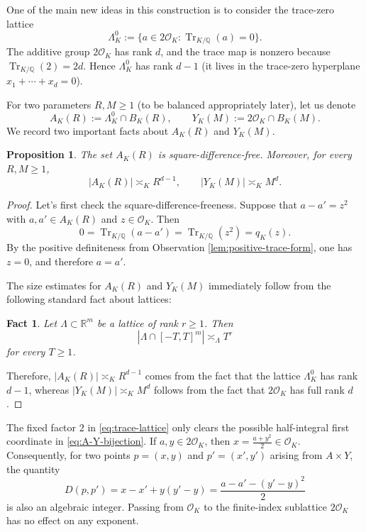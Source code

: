 \documentclass[11pt,reqno]{amsart}
\newtheorem{proposition}[proposition]{Proposition}
\newtheorem{fact}[fact]{Fact}
\theoremstyle{definition}
\theoremstyle{remark}
\newcommand{\R}{\mathbb{R}}
\newcommand{\Q}{\mathbb{Q}}
\newcommand{\OK}{\mathcal{O}_K}
\newcommand{\Tr}{\operatorname{Tr}}
\begin{document}
One of the main new ideas in this construction is to consider the trace-zero lattice
\begin{equation}
\label{eq:trace-lattice}
        \Lambda_K^0
        :=
        \{a\in2\OK:\Tr_{K/\Q}(a)=0\}.
\end{equation}
The additive group $2\OK$ has rank $d$, and the trace map is nonzero because $\Tr_{K/\Q}(2)=2d$.  Hence $\Lambda_K^0$ has rank $d-1$ (it lives in the trace-zero hyperplane
$x_1+\cdots+x_d=0$).  

For two parameters $R,M\ge1$ (to be balanced appropriately later), let us denote
\begin{equation}
\label{eq:AK-YK}
        A_K(R):=\Lambda_K^0\cap B_K(R),
        \qquad
        Y_K(M):=2\OK\cap B_K(M).
\end{equation}
We record two important facts about $A_{K}(R)$ and $Y_{K}(M)$. 
\begin{proposition}
\label{prop:trace-sets}
The set $A_K(R)$ is square-difference-free. Moreover, for every $R,M\ge1$,
\begin{equation}
\label{eq:trace-counts}
        |A_K(R)|\asymp_K R^{d-1},
        \qquad
        |Y_K(M)|\asymp_K M^d.
\end{equation}
\end{proposition}


\begin{proof}
Let's first check the square-difference-freeness. Suppose that $a-a'=z^2$ with $a,a'\in A_K(R)$ and $z\in\OK$.  Then
\[
        0
        =\Tr_{K/\Q}(a-a')
        =\Tr_{K/\Q}(z^2)
        =q_K(z).
\]
By the positive definiteness from Observation \ref{lem:positive-trace-form}, one has $z=0$, and therefore $a=a'$. 

The size estimates for $A_{K}(R)$ and $Y_{K}(M)$ immediately follow from the following standard fact about lattices:

\begin{fact}
\label{lem:lattice-count}
Let $\Lambda\subset\R^m$ be a lattice of rank $r\ge1$.  Then
\[
        |\Lambda\cap[-T,T]^m|\asymp_{\Lambda}T^r
\]
for every $T\ge1$.
\end{fact}

Therefore, $|A_K(R)|\asymp_K R^{d-1}$ comes from the fact that the lattice $\Lambda_K^0$ has rank $d-1$, whereas $|Y_K(M)|\asymp_K M^d$ follows from the fact that $2\OK$ has full rank $d$. 


\end{proof}

The fixed factor $2$ in \eqref{eq:trace-lattice} only clears the
possible half-integral first coordinate in \eqref{eq:A-Y-bijection}.
If $a,y\in2\OK$, then $x=\frac{a+y^2}{2}\in\OK$. Consequently, for two points $p=(x,y)$ and $p'=(x',y')$ arising from
$A\times Y$, the quantity
\[
        D(p,p')
        =x-x'+y(y'-y)
        =\frac{a-a'-(y'-y)^2}{2}
\]
is also an algebraic integer.  Passing from $\OK$ to the finite-index
sublattice $2\OK$ has no effect on any exponent.
\end{document}
